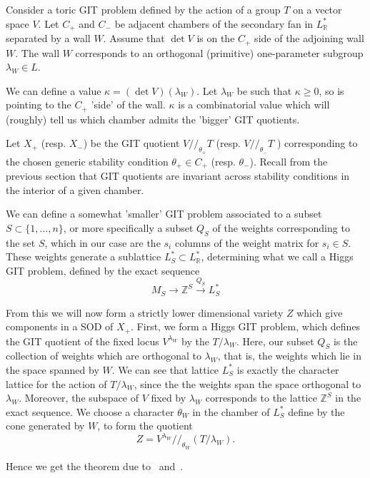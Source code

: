 Consider a toric GIT problem defined by the action of a group $T$ on a vector space $V$. Let $C_+$ and $C_-$ be adjacent chambers of the secondary fan in $L^{*}_\mathbb{R}$ separated by a wall $W$. Assume that $\det V$ is on the $C_{+}$ side of the adjoining wall $W$. The wall $W$ corresponds to an orthogonal (primitive) one-parameter subgroup $\lambda_{W}\in L$.

We can define a value $\kappa = (\det V)(\lambda_W)$. Let $\lambda_W$ be such that $\kappa \geq 0$, so is pointing to the $C_+$ 'side' of the wall. $\kappa$ is a combinatorial value which will (roughly) tell us which chamber admits the 'bigger' GIT quotients. 

Let $X_+$ (resp. $X_-$) be the GIT quotient $V // _{\theta_{+}}T$ (resp. $V // _{\theta_{-}}T$ ) corresponding to the chosen generic stability condition $\theta_{+}\in C_+$ (resp. $\theta_-$).  Recall from the previous section that GIT quotients are invariant across stability conditions in the interior of a given chamber. 

We can define a somewhat 'smaller' GIT problem associated to a subset $S \subset \{ 1,\dots,n \}$, or more specifically a subset $Q_S$ of the weights corresponding to the set $S$, which in our case are the $s_i$ columns of the weight matrix for $s_{i}\in S$. These weights generate a sublattice $L_{S}^{*}\subset L_\mathbb{R}^*$, determining what we call a Higgs GIT problem, defined by the exact sequence $$M_{S}\to \mathbb{Z}^{S}\xrightarrow{Q_{S}}L_{S}^{*}$$

From this we will now form a strictly lower dimensional variety $Z$ which give components in a SOD of $X_+$. First, we form a Higgs GIT problem, which defines the GIT quotient of the fixed locus $V^{\lambda_{W}}$ by the $T/\lambda_W$. Here, our subset $Q_S$  is the collection of weights which are orthogonal to $\lambda_W$, that is, the weights which lie in the space spanned by $W$. We can see that lattice $L_S^*$ is exactly the character lattice for the action of $T/\lambda_W$, since the the weights span the space orthogonal to $\lambda_W$. Moreover, the subspace of $V$ fixed by $\lambda_W$ corresponds to the lattice $\mathbb{Z}^S$ in the exact sequence. We choose a character $\theta_W$ in the chamber of $L_{S}^*$ define by the cone generated by $W$, to form the quotient $$Z = V^{\lambda_{W}} / /_{\theta_{W}} \left( T/ \lambda_{W}\right) . $$

Hence we get the theorem due to~\cite*{halpernleistner2014derived} and~\cite*{ballard2014variation}.

